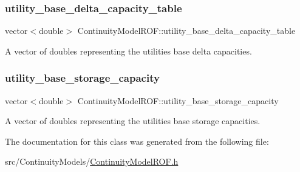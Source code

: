 \subsubsection{\texorpdfstring{utility\+\_\+base\+\_\+delta\+\_\+capacity\+\_\+table}{utility\_base\_delta\_capacity\_table}}
{\footnotesize\ttfamily vector$<$double$>$ Continuity\+Model\+R\+O\+F\+::utility\+\_\+base\+\_\+delta\+\_\+capacity\+\_\+table\hspace{0.3cm}{\ttfamily [protected]}}



A vector of doubles representing the utilities\textquotesingle{} base delta capacities. 

\mbox{\label{classContinuityModelROF_a6a429c37f019777325ea4e5b9ad26cae}} 
\subsubsection{\texorpdfstring{utility\+\_\+base\+\_\+storage\+\_\+capacity}{utility\_base\_storage\_capacity}}
{\footnotesize\ttfamily vector$<$double$>$ Continuity\+Model\+R\+O\+F\+::utility\+\_\+base\+\_\+storage\+\_\+capacity\hspace{0.3cm}{\ttfamily [protected]}}



A vector of doubles representing the utilities\textquotesingle{} base storage capacities. 



The documentation for this class was generated from the following file\+:\begin{DoxyCompactItemize}
\item 
src/\+Continuity\+Models/\mbox{\hyperlink{ContinuityModelROF_8h}{Continuity\+Model\+R\+O\+F.\+h}}\end{DoxyCompactItemize}
